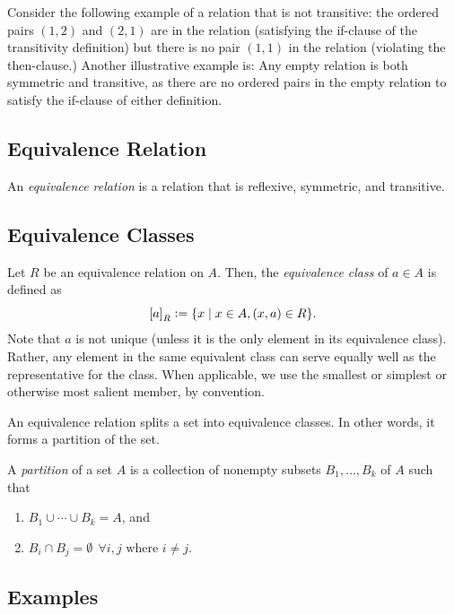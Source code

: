 \documentclass[12pt,letterpaper]{article}
\newcommand{\defeq}{\vcentcolon=}
\begin{document}
    Consider the following example of a relation that is not transitive: the ordered pairs $(1,2)$ and $(2,1)$ are in the relation (satisfying the if-clause of the transitivity definition) but there is no pair $(1,1)$ in the relation (violating the then-clause.) Another illustrative example is: Any empty relation is both symmetric and transitive, as there are no ordered pairs in the empty relation to satisfy the if-clause of either definition.
    
    \subsection{Equivalence Relation}
    An \textit{equivalence relation} is a relation that is reflexive, symmetric, and transitive.
    
    \subsection{Equivalence Classes}
    Let $R$ be an equivalence relation on $A$. Then, the \textit{equivalence class} of $a \in A$ is defined as
    \[
    \left[a\right]_R \defeq \{x \mid x\in A, (x,a) \in R\}.
    \]
    Note that $a$ is not unique (unless it is the only element in its equivalence class). Rather, any element in the same equivalent class can serve equally well as the representative for the class. When applicable, we use the smallest or simplest or otherwise most salient member, by convention.
    
    An equivalence relation splits a set into equivalence classes. In other words, it forms a partition of the set.
    
    A \textit{partition} of a set $A$ is a collection of nonempty subsets $B_1, \ldots, B_k$ of $A$ such that
    \begin{enumerate}
    \item $B_1 \cup \cdots \cup B_k = A$, and
    \item $B_i \cap B_j = \emptyset \ \ \forall i,j \text{ where } i \neq j$.
    \end{enumerate}
    
    \subsection{Examples}
    
\end{document}
